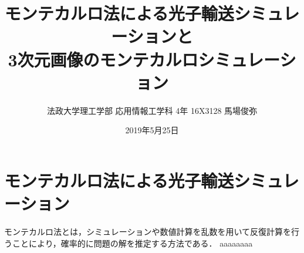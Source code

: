 \documentclass[dvipdfmx,autodetect-engine,twocolumn,10pt]{jsarticle}%
\title{モンテカルロ法による光子輸送シミュレーションと\\
3次元画像のモンテカルロシミュレーション}
\author{法政大学理工学部 応用情報工学科 4年 16X3128 馬場俊弥}
\date{2019年5月25日}
\begin{document}
\maketitle
\section{モンテカルロ法による光子輸送シミュレーション}
モンテカルロ法とは，シミュレーションや数値計算を乱数を用いて反復計算を行うことにより，確率的に問題の解を推定する方法である．
aaaaaaaa
\end{document}
